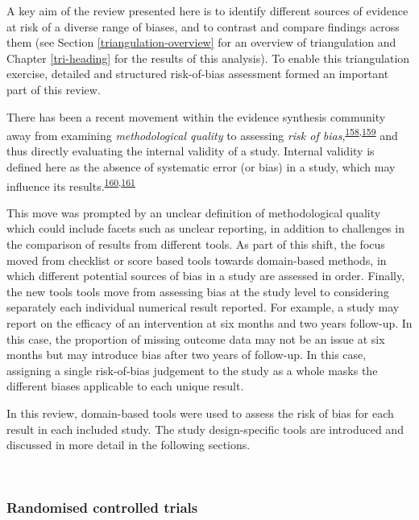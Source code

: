 \documentclass[a4paper, twoside]{templates/ociamthesis}
\begin{document}
A key aim of the review presented here is to identify different sources of evidence at risk of a diverse range of biases, and to contrast and compare findings across them (see Section \ref{triangulation-overview} for an overview of triangulation and Chapter \ref{tri-heading} for the results of this analysis). To enable this triangulation exercise, detailed and structured risk-of-bias assessment formed an important part of this review.

There has been a recent movement within the evidence synthesis community away from examining \emph{methodological quality} to assessing \emph{risk of bias},\textsuperscript{\protect\hyperlink{ref-mcguinness2018}{158},\protect\hyperlink{ref-sterne2016}{159}} and thus directly evaluating the internal validity of a study. Internal validity is defined here as the absence of systematic error (or bias) in a study, which may influence its results.\textsuperscript{\protect\hyperlink{ref-campbell1957}{160},\protect\hyperlink{ref-juni2001}{161}}

This move was prompted by an unclear definition of methodological quality which could include facets such as unclear reporting, in addition to challenges in the comparison of results from different tools. As part of this shift, the focus moved from checklist or score based tools towards domain-based methods, in which different potential sources of bias in a study are assessed in order. Finally, the new tools tools move from assessing bias at the study level to considering separately each individual numerical result reported. For example, a study may report on the efficacy of an intervention at six months and two years follow-up. In this case, the proportion of missing outcome data may not be an issue at six months but may introduce bias after two years of follow-up. In this case, assigning a single risk-of-bias judgement to the study as a whole masks the different biases applicable to each unique result.

In this review, domain-based tools were used to assess the risk of bias for each result in each included study. The study design-specific tools are introduced and discussed in more detail in the following sections.

~

\hypertarget{randomised-controlled-trials-1}{%
\subsubsection{Randomised controlled trials}\label{randomised-controlled-trials-1}}
\end{document}
